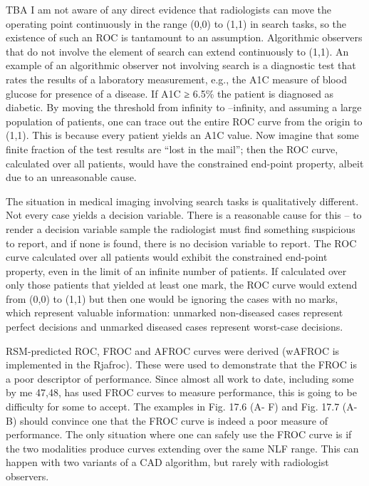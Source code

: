 \documentclass[
]{book}
\begin{document}
TBA I am not aware of any direct evidence that radiologists can move the operating point continuously in the range (0,0) to (1,1) in search tasks, so the existence of such an ROC is tantamount to an assumption. Algorithmic observers that do not involve the element of search can extend continuously to (1,1). An example of an algorithmic observer not involving search is a diagnostic test that rates the results of a laboratory measurement, e.g., the A1C measure of blood glucose for presence of a disease. If A1C ≥ 6.5\% the patient is diagnosed as diabetic. By moving the threshold from infinity to --infinity, and assuming a large population of patients, one can trace out the entire ROC curve from the origin to (1,1). This is because every patient yields an A1C value. Now imagine that some finite fraction of the test results are ``lost in the mail''; then the ROC curve, calculated over all patients, would have the constrained end-point property, albeit due to an unreasonable cause.

The situation in medical imaging involving search tasks is qualitatively different. Not every case yields a decision variable. There is a reasonable cause for this -- to render a decision variable sample the radiologist must find something suspicious to report, and if none is found, there is no decision variable to report. The ROC curve calculated over all patients would exhibit the constrained end-point property, even in the limit of an infinite number of patients. If calculated over only those patients that yielded at least one mark, the ROC curve would extend from (0,0) to (1,1) but then one would be ignoring the cases with no marks, which represent valuable information: unmarked non-diseased cases represent perfect decisions and unmarked diseased cases represent worst-case decisions.

RSM-predicted ROC, FROC and AFROC curves were derived (wAFROC is implemented in the Rjafroc). These were used to demonstrate that the FROC is a poor descriptor of performance. Since almost all work to date, including some by me 47,48, has used FROC curves to measure performance, this is going to be difficulty for some to accept. The examples in Fig. 17.6 (A- F) and Fig. 17.7 (A-B) should convince one that the FROC curve is indeed a poor measure of performance. The only situation where one can safely use the FROC curve is if the two modalities produce curves extending over the same NLF range. This can happen with two variants of a CAD algorithm, but rarely with radiologist observers.
\end{document}
